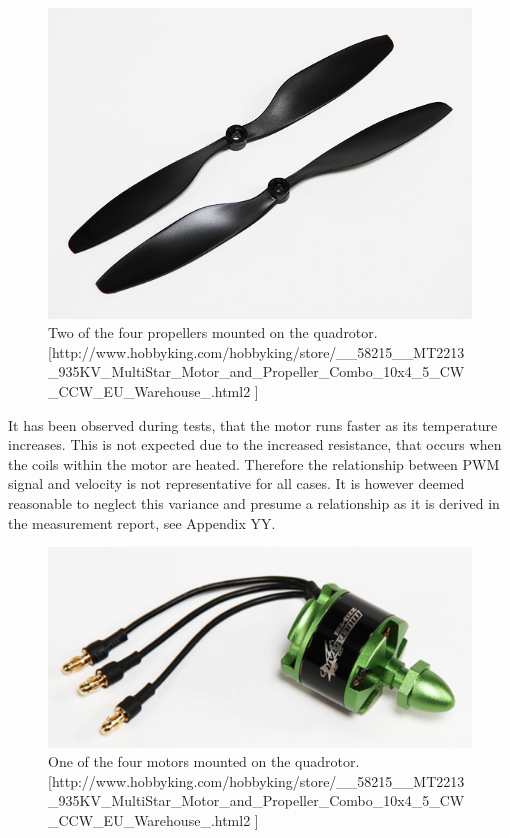 \begin{figure}[H]
	\centering
	\includegraphics[scale=0.5]{figures/propeller.png}
	\caption{Two of the four propellers 										mounted on the quadrotor.[http://www.hobbyking.com/hobbyking/store/__58215__MT2213_935KV_MultiStar_Motor_and_Propeller_Combo_10x4_5_CW_CCW_EU_Warehouse_.html2 
]}
	\label{fig:Propeller}
\end{figure}
It has been observed during tests, that the motor runs faster as its temperature increases. This is not expected due to the increased resistance, that occurs when the coils within the motor are heated. Therefore the relationship between PWM signal and velocity is not representative for all cases. It is however deemed reasonable to neglect this variance and presume a relationship as it is derived in the measurement report, see Appendix YY. 
\newpar 
\begin{figure}[H]
	\centering
	\includegraphics[scale=0.5]{figures/motor.png}
	\caption{One of the four motors mounted on the quadrotor.[http://www.hobbyking.com/hobbyking/store/__58215__MT2213_935KV_MultiStar_Motor_and_Propeller_Combo_10x4_5_CW_CCW_EU_Warehouse_.html2 
]}
	\label{fig:Motor}
\end{figure}


